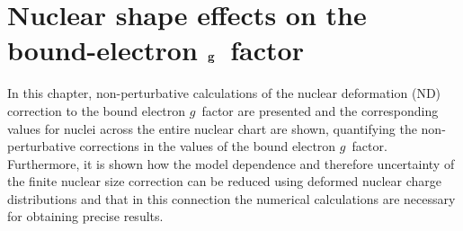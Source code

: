 \chapter{Nuclear shape effects on the bound-electron $\bf{g}$~factor}
\label{ch:nucl_def}

In this chapter, non-perturbative calculations of the nuclear deformation (ND) correction to the bound electron $g$~factor are presented and the corresponding values for nuclei across the entire nuclear chart are shown, quantifying the non-perturbative corrections in the values of the bound electron $g$~factor. Furthermore, it is shown how the model dependence and therefore uncertainty of the finite nuclear size correction can be reduced using deformed nuclear charge distributions and that in this connection the numerical calculations are necessary for obtaining precise results.

